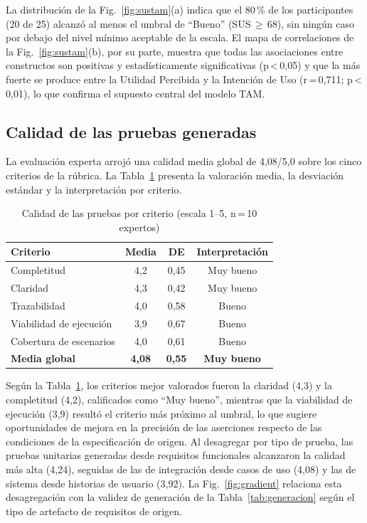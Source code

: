 \documentclass[10pt,journal,twoside,letterpaper]{IEEEtran}
\begin{document}
	La distribución de la Fig.~\ref{fig:sustam}(a) indica que el 80\,\% de los participantes (20 de 25) alcanzó al menos el umbral de ``Bueno'' (SUS\,$\geq$\,68), sin ningún caso por debajo del nivel mínimo aceptable de la escala. El mapa de correlaciones de la Fig.~\ref{fig:sustam}(b), por su parte, muestra que todas las asociaciones entre constructos son positivas y estadísticamente significativas (p\,<\,0,05) y que la más fuerte se produce entre la Utilidad Percibida y la Intención de Uso (r\,=\,0,711; p\,<\,0,01), lo que confirma el supuesto central del modelo TAM.

	\subsection{Calidad de las pruebas generadas}
	\label{subsec:calidad}

	La evaluación experta arrojó una calidad media global de 4,08/5,0 sobre los cinco criterios de la rúbrica. La Tabla~\ref{tab:calidad} presenta la valoración media, la desviación estándar y la interpretación por criterio.

	\begin{table}[!tb]
		\caption{Calidad de las pruebas por criterio (escala 1--5, n\,=\,10 expertos)}
		\label{tab:calidad}
		\centering
		\small
		\begin{tabular}{@{}lccc@{}}
			\toprule
			\textbf{Criterio} & \textbf{Media} & \textbf{DE} & \textbf{Interpretación} \\
			\midrule
			Completitud            & 4,2 & 0,45 & Muy bueno \\
			Claridad               & 4,3 & 0,42 & Muy bueno \\
			Trazabilidad           & 4,0 & 0,58 & Bueno \\
			Viabilidad de ejecución & 3,9 & 0,67 & Bueno \\
			Cobertura de escenarios & 4,0 & 0,61 & Bueno \\
			\midrule
			\textbf{Media global}  & \textbf{4,08} & \textbf{0,55} & \textbf{Muy bueno} \\
			\bottomrule
		\end{tabular}
	\end{table}

	Según la Tabla~\ref{tab:calidad}, los criterios mejor valorados fueron la claridad (4,3) y la completitud (4,2), calificados como ``Muy bueno'', mientras que la viabilidad de ejecución (3,9) resultó el criterio más próximo al umbral, lo que sugiere oportunidades de mejora en la precisión de las aserciones respecto de las condiciones de la especificación de origen. Al desagregar por tipo de prueba, las pruebas unitarias generadas desde requisitos funcionales alcanzaron la calidad más alta (4,24), seguidas de las de integración desde casos de uso (4,08) y las de sistema desde historias de usuario (3,92). La Fig.~\ref{fig:gradient} relaciona esta desagregación con la validez de generación de la Tabla~\ref{tab:generacion} según el tipo de artefacto de requisitos de origen.
\end{document}
